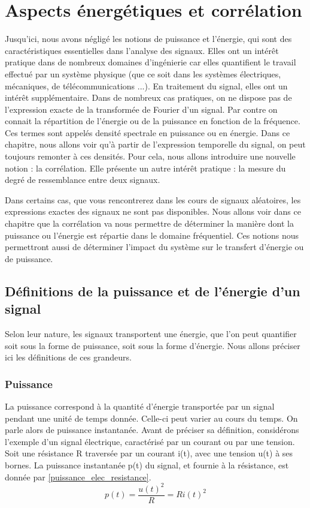 \chapter{Aspects énergétiques et corrélation}
	
	Jusqu'ici, nous avons négligé les notions de puissance et l'énergie, qui sont des caractéristiques essentielles dans l'analyse des signaux. Elles ont un intérêt pratique dans de nombreux domaines d'ingénierie car elles quantifient le travail effectué par un système physique (que ce soit dans les systèmes électriques, mécaniques, de télécommunications ...).	  
	En traitement du signal, elles ont un intérêt supplémentaire. Dans de nombreux cas pratiques, on ne dispose pas de l'expression exacte de la transformée de Fourier d'un signal. Par contre on connait la répartition de l'énergie ou de la puissance en fonction de la fréquence. Ces termes sont appelés densité spectrale en puissance ou en énergie.
	Dans ce chapitre, nous allons voir qu'à partir de l'expression temporelle du signal, on peut toujours remonter à ces densités. Pour cela, nous allons introduire une nouvelle notion : la corrélation. Elle présente un autre intérêt pratique : la mesure du degré de ressemblance entre deux signaux. 
	
	Dans certains cas, que vous rencontrerez dans les cours de signaux aléatoires, les expressions exactes des signaux ne sont pas disponibles. Nous allons voir dans ce chapitre que la corrélation va nous permettre de déterminer la manière dont la puissance ou l'énergie est répartie dans le domaine fréquentiel. Ces notions nous permettront aussi de déterminer l'impact du système sur le transfert d'énergie ou de puissance. 
	
	\section{Définitions de la puissance et de l'énergie d'un signal}
	Selon leur nature, les signaux transportent une énergie, que l'on peut quantifier soit sous la forme de puissance, soit sous la forme d'énergie. Nous allons préciser ici les définitions de ces grandeurs.
	
	\subsection{Puissance}
	La puissance correspond à la quantité d'énergie transportée par un signal pendant une unité de temps donnée. Celle-ci peut varier au cours du temps. On parle alors de puissance instantanée. Avant de préciser sa définition, considérons l'exemple d'un signal électrique, caractérisé par un courant ou par une tension. Soit une résistance R traversée par un courant i(t), avec une tension u(t) à ses bornes. La puissance instantanée p(t) du signal, et fournie à la résistance, est donnée par \ref{puissance_elec_resistance}.
	\begin{equation}\label{puissance_elec_resistance}
	p(t)=\frac{u(t)^{2}}{R}=Ri(t)^{2}
	\end{equation}
	
